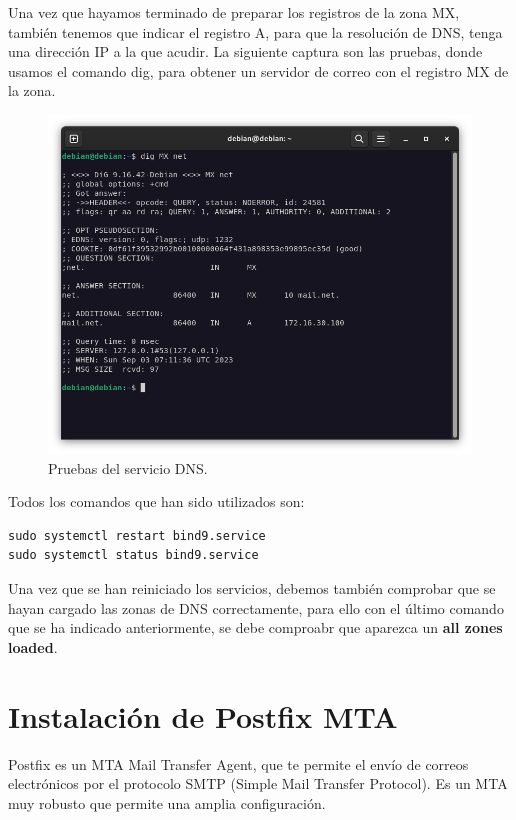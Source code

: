Una vez que hayamos terminado de preparar los registros de la zona MX, también tenemos que indicar el registro A, para que la resolución de DNS, tenga una dirección IP a la que acudir. La siguiente captura son las pruebas, donde usamos el comando dig, para obtener un servidor de correo con el registro MX de la zona.

\begin{figure}[H]
	\centering
	\includegraphics[scale=0.30]{01}
	\caption{Pruebas del servicio DNS.}
\end{figure}


Todos los comandos que han sido utilizados son:

\begin{lstlisting}[style=mybash]
sudo systemctl restart bind9.service
sudo systemctl status bind9.service
\end{lstlisting}

Una vez que se han reiniciado los servicios, debemos también comprobar que se hayan cargado las zonas de DNS correctamente, para ello con el último comando que se ha indicado anteriormente, se debe comproabr que aparezca un \textbf{all zones loaded}.

\section{Instalación de Postfix MTA}

Postfix es un MTA Mail Transfer Agent, que te permite el envío de correos electrónicos por el protocolo SMTP (Simple Mail Transfer Protocol). Es un MTA muy robusto que permite una amplia configuración.
\vspace{5mm}

